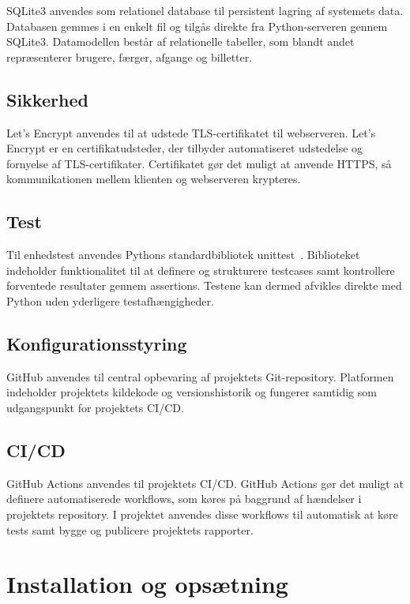 \documentclass[a4paper, 11pt]{article}
\begin{document}
SQLite3 anvendes som relationel database til persistent lagring af systemets data.
Databasen gemmes i en enkelt fil og tilgås direkte fra Python-serveren gennem SQLite3.
Datamodellen består af relationelle tabeller, som blandt andet repræsenterer brugere,
færger, afgange og billetter.

\subsection{Sikkerhed}

Let's Encrypt anvendes til at udstede TLS-certifikatet til webserveren. Let's Encrypt er en
certifikatudsteder, der tilbyder automatiseret udstedelse og fornyelse af TLS-certifikater.
Certifikatet gør det muligt at anvende HTTPS, så kommunikationen mellem klienten og
webserveren krypteres.

\subsection{Test}

Til enhedstest anvendes Pythons standardbibliotek unittest~\cite{unittest}.
Biblioteket indeholder funktionalitet til at definere og
strukturere testcases samt kontrollere forventede resultater gennem assertions. Testene kan
dermed afvikles direkte med Python uden yderligere testafhængigheder.

\subsection{Konfigurationsstyring}

GitHub anvendes til central opbevaring af projektets Git-repository. Platformen indeholder
projektets kildekode og versionshistorik og fungerer samtidig som udgangspunkt for
projektets CI/CD.

\subsection{CI/CD}

GitHub Actions anvendes til projektets CI/CD. GitHub Actions gør det muligt at definere
automatiserede workflows, som køres på baggrund af hændelser i projektets repository. I
projektet anvendes disse workflows til automatisk at køre tests samt bygge og publicere
projektets rapporter.

\section{Installation og opsætning}
\end{document}
